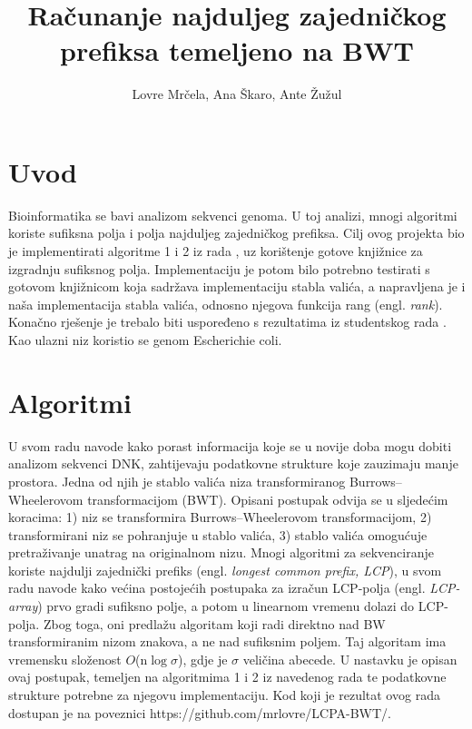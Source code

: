 \documentclass[times, utf8, seminar]{fer}
\begin{document}
\title{Računanje najduljeg zajedničkog prefiksa temeljeno na BWT}

\author{Lovre Mrčela, Ana Škaro, Ante Žužul}


\maketitle

\tableofcontents

\chapter{Uvod}

Bioinformatika se bavi analizom sekvenci genoma. U toj analizi, mnogi algoritmi koriste sufiksna polja i polja najduljeg zajedničkog prefiksa. Cilj ovog projekta bio je implementirati algoritme 1 i 2 iz rada \cite{beller2013}, uz korištenje gotove knjižnice za izgradnju sufiksnog polja. Implementaciju je potom bilo potrebno testirati s gotovom knjižnicom koja sadržava implementaciju stabla valića, a napravljena je i naša implementacija stabla valića, odnosno njegova funkcija rang (engl. \textit{rank}). Konačno rješenje je trebalo biti uspoređeno s rezultatima iz studentskog rada \cite{studenti2016}. Kao ulazni niz koristio se genom Escherichie coli.

\chapter{Algoritmi}
U svom radu \cite{beller2013} navode kako porast informacija koje se u novije doba mogu dobiti analizom sekvenci DNK, zahtijevaju podatkovne strukture koje zauzimaju manje prostora. Jedna od njih je stablo valića niza transformiranog Burrows--Wheelerovom transformacijom (BWT). Opisani postupak odvija se u sljedećim koracima: 1) niz se transformira Burrows--Wheelerovom transformacijom, 2) transformirani niz se pohranjuje u stablo valića, 3) stablo valića omogućuje pretraživanje unatrag na originalnom nizu.
Mnogi algoritmi za sekvenciranje koriste najdulji zajednički prefiks (engl. \textit{longest common prefix, LCP}), \cite{beller2013} u svom radu navode kako većina postojećih postupaka za izračun LCP-polja (engl. \textit{LCP-array}) prvo gradi sufiksno polje, a potom u linearnom vremenu dolazi do LCP-polja. Zbog toga, oni predlažu algoritam koji radi direktno nad BW transformiranim nizom znakova, a ne nad sufiksnim poljem. Taj algoritam ima vremensku složenost $O$(n$\log\sigma$), gdje je $\sigma$ veličina abecede. U nastavku je opisan ovaj postupak, temeljen na algoritmima 1 i 2 iz navedenog rada te podatkovne strukture potrebne za njegovu implementaciju. Kod koji je rezultat ovog rada dostupan je na poveznici https://github.com/mrlovre/LCPA-BWT/.
\end{document}
